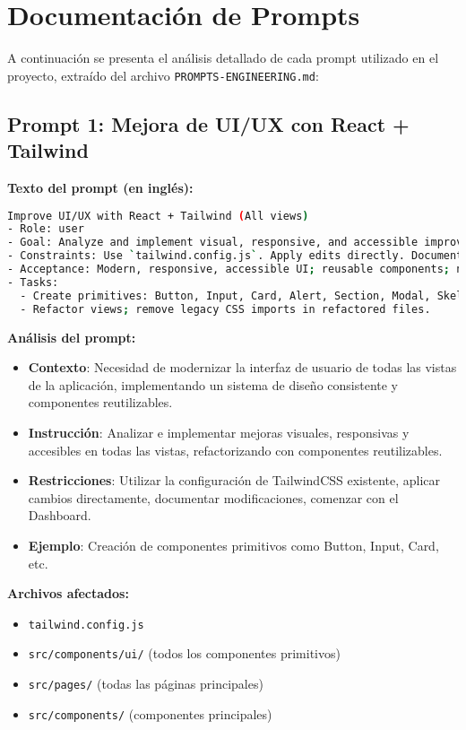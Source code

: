 \documentclass[12pt,a4paper]{article}
\begin{document}
\section{Documentación de Prompts}

A continuación se presenta el análisis detallado de cada prompt utilizado en el proyecto, extraído del archivo \texttt{PROMPTS-ENGINEERING.md}:

\subsection{Prompt 1: Mejora de UI/UX con React + Tailwind}

\textbf{Texto del prompt (en inglés):}
\begin{lstlisting}[language=bash]
Improve UI/UX with React + Tailwind (All views)
- Role: user
- Goal: Analyze and implement visual, responsive, and accessible improvements across Dashboard, Game, Auth, Lobby, Summary, Admin, Home, Profile; refactor with reusable components.
- Constraints: Use `tailwind.config.js`. Apply edits directly. Document changes. Start with Dashboard.
- Acceptance: Modern, responsive, accessible UI; reusable components; no broken flows.
- Tasks:
  - Create primitives: Button, Input, Card, Alert, Section, Modal, Skeleton, Spinner.
  - Refactor views; remove legacy CSS imports in refactored files.
\end{lstlisting}

\textbf{Análisis del prompt:}
\begin{itemize}
    \item \textbf{Contexto}: Necesidad de modernizar la interfaz de usuario de todas las vistas de la aplicación, implementando un sistema de diseño consistente y componentes reutilizables.
    \item \textbf{Instrucción}: Analizar e implementar mejoras visuales, responsivas y accesibles en todas las vistas, refactorizando con componentes reutilizables.
    \item \textbf{Restricciones}: Utilizar la configuración de TailwindCSS existente, aplicar cambios directamente, documentar modificaciones, comenzar con el Dashboard.
    \item \textbf{Ejemplo}: Creación de componentes primitivos como Button, Input, Card, etc.
\end{itemize}

\textbf{Archivos afectados:}
\begin{itemize}
    \item \texttt{tailwind.config.js}
    \item \texttt{src/components/ui/} (todos los componentes primitivos)
    \item \texttt{src/pages/} (todas las páginas principales)
    \item \texttt{src/components/} (componentes principales)
\end{itemize}
\end{document}
